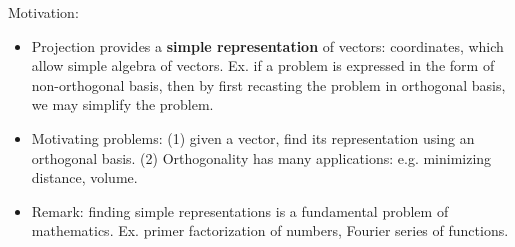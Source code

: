 \documentclass{report}
\begin{document}
Motivation: 
\begin{itemize}
\item Projection provides a \textbf{simple representation} of vectors: coordinates, which allow simple algebra of vectors. Ex. if a problem is expressed in the form of non-orthogonal basis, then by first recasting the problem in orthogonal basis, we may simplify the problem. 

\item Motivating problems: (1) given a vector, find its representation using an orthogonal basis. (2) Orthogonality has many applications: e.g. minimizing distance, volume. 

\item Remark: finding simple representations is a fundamental problem of mathematics. Ex. primer factorization of numbers, Fourier series of functions. 
\end{itemize}
\end{document}
